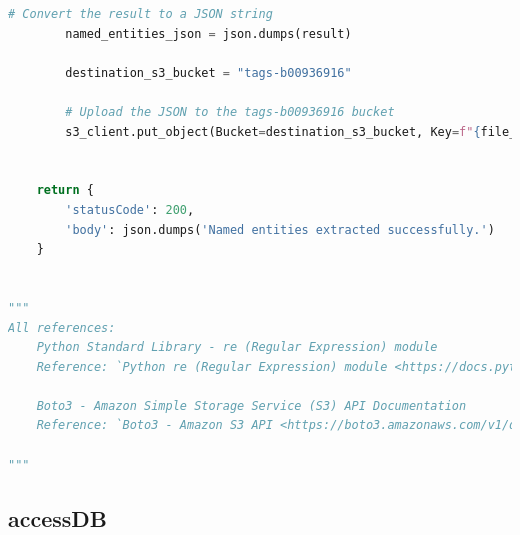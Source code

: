 \begin{mdframed}[linewidth=1pt]
\begin{lstlisting}[language=Python]
        # Convert the result to a JSON string
        named_entities_json = json.dumps(result)
        
        destination_s3_bucket = "tags-b00936916"

        # Upload the JSON to the tags-b00936916 bucket
        s3_client.put_object(Bucket=destination_s3_bucket, Key=f"{file_name}ne.txt", Body=named_entities_json)

    
    return {
        'statusCode': 200,
        'body': json.dumps('Named entities extracted successfully.')
    }


"""
All references:
    Python Standard Library - re (Regular Expression) module
    Reference: `Python re (Regular Expression) module <https://docs.python.org/3/library/re.html>`_

    Boto3 - Amazon Simple Storage Service (S3) API Documentation
    Reference: `Boto3 - Amazon S3 API <https://boto3.amazonaws.com/v1/documentation/api/latest/reference/services/s3.html>`_

"""
\end{lstlisting}
\end{mdframed}
\subsection{accessDB}




